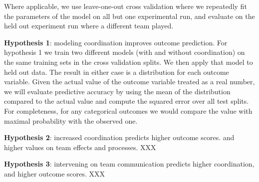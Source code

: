Where applicable, we use leave-one-out cross validation where we repeatedly fit the
parameters of the model on all but one experimental run, and evaluate on the
held out experiment run where a different team played. 

\textbf{Hypothesis 1}: modeling coordination improves outcome prediction.
For hypothesis 1 we train two different models (with and without coordination)
on the same training sets in the cross validation splits. We then apply that
model to held out data. The result in either case is a distribution for each
outcome variable. Given the actual value of the outcome variable treated as a
real number, we will evaluate predictive accuracy by using the mean of the
distribution compared to the actual value and compute the squared error over all
test splits. For completeness, for any categorical outcomes we would compare the
value with maximal probability with the observed one. 

\textbf{Hypothesis 2}: increased coordination predicts higher outcome scores.
and higher values on team effects and processes. XXX


\textbf{Hypothesis 3}: intervening on team communication predicts higher
coordination, and higher outcome scores. XXX


